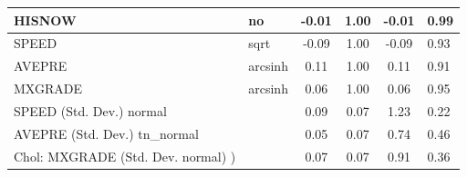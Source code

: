 \begin{table}
\begin{center}
\begin{tabular}{|l|l|c|c|c|l|}
			\hline
			HISNOW & no & -0.01 & 1.00 & -0.01 & 0.99 \\
			\hline
			SPEED & sqrt & -0.09 & 1.00 & -0.09 & 0.93 \\
			\hline
			AVEPRE & arcsinh & 0.11 & 1.00 & 0.11 & 0.91 \\
			\hline
			MXGRADE & arcsinh & 0.06 & 1.00 & 0.06 & 0.95 \\
			\hline
			SPEED (Std. Dev.) normal &  & 0.09 & 0.07 & 1.23 & 0.22 \\
			\hline
			AVEPRE (Std. Dev.) tn_normal &  & 0.05 & 0.07 & 0.74 & 0.46 \\
			\hline
			 Chol: MXGRADE (Std. Dev. normal) ) &  & 0.07 & 0.07 & 0.91 & 0.36 \\
			\hline
		\end{tabular}
	\end{center}
\end{table}